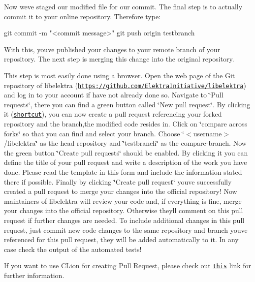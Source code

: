 Now we\textquotesingle{}ve staged our modified file for our commit. The final step is to actually commit it to your online repository. Therefore type\+:


\begin{DoxyCode}
git commit -m "<commit message>"
git push origin testbranch
\end{DoxyCode}


With this, you\textquotesingle{}ve published your changes to your remote branch of your repository. The next step is merging this change into the original repository.

This step is most easily done using a browser. Open the web page of the Git repository of libelektra (\href{https://github.com/ElektraInitiative/libelektra}{\tt https\+://github.\+com/\+Elektra\+Initiative/libelektra}) and log in to your account if have not already done so. Navigate to \char`\"{}\+Pull
requests\char`\"{}, there you can find a green button called \char`\"{}\+New pull request\char`\"{}. By clicking it (\href{https://github.com/ElektraInitiative/libelektra/compare}{\tt shortcut}), you can now create a pull request referencing your forked repository and the branch,the modified code resides in. Click on \char`\"{}compare across forks\char`\"{} so that you can find and select your branch. Choose \char`\"{}$<$username$>$/libelektra\char`\"{} as the head repository and \char`\"{}testbranch\char`\"{} as the compare-\/branch. Now the green button \char`\"{}\+Create pull requests\char`\"{} should be enabled. By clicking it you can define the title of your pull request and write a description of the work you have done. Please read the template in this form and include the information stated there if possible. Finally by clicking \char`\"{}\+Create pull request\char`\"{} you\textquotesingle{}ve successfully created a pull request to merge your changes into the official repository! Now maintainers of libelektra will review your code and, if everything is fine, merge your changes into the official repository. Otherwise they\textquotesingle{}ll comment on this pull request if further changes are needed. To include additional changes in this pull request, just commit new code changes to the same repository and branch you\textquotesingle{}ve referenced for this pull request, they will be added automatically to it. In any case check the output of the automated tests!

If you want to use C\+Lion for creating Pull Request, please check out \href{https://www.jetbrains.com/help/clion/contribute-to-projects.html#create-pull-request}{\tt this} link for further information.

